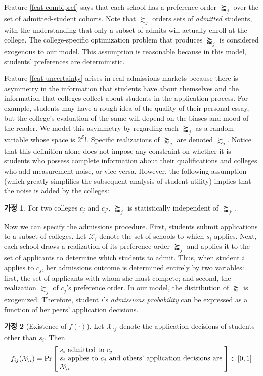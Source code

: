 \documentclass[12pt]{article} %
\theoremstyle{definition}
\newtheorem{assumption}{Assumption}
\theoremstyle{definition}
\newtheorem{assumption}{가정}
\begin{document}
Feature \ref{feat-combipref} says that each school has a preference order $\succapprox_j$ over the set of admitted-student cohorts. Note that $\succsim_j$ orders sets of \emph{admitted} students, with the understanding that only a subset of admits will actually enroll at the college. The college-specific optimization problem that produces $\succapprox_j$ is considered exogenous to our model. This assumption is reasonable because in this model, students' preferences are deterministic. 

Feature \ref{feat-uncertainty} arises in real admissions markets because there is asymmetry in the information that students have about themselves and the information that colleges collect about students in the application process. For example, students may have a rough idea of the quality of their personal essay, but the college's evaluation of the same will depend on the biases and mood of the reader. We model this asymmetry by regarding each $\succapprox_j$ as a random variable whose space is $2^{\mathcal{S}}!$. Specific realizations of $\succapprox_j$ are denoted $\succsim_j$. Notice that this definition alone does not impose any constraint on whether it is students who possess complete information about their qualifications and colleges who add measurement noise, or vice-versa. However, the following assumption (which greatly simplifies the subsequent analysis of student utility) implies that the noise is added by the colleges:
\begin{assumption} \label{preforderdrawnindep}
For two colleges $c_j$ and $c_{j'}$, $\succapprox_j$ is statistically independent of $\succapprox_{j'}$. 
\end{assumption}

Now we can specify the admissions procedure. First, students submit applications to a subset of colleges. Let $\mathcal{X}_i$ denote the set of schools to which $s_i$ applies. Next, each school draws a realization of its preference order $\succapprox_j$ and applies it to the set of applicants to determine which students to admit. Thus, when student $i$ applies to $c_j$, her admissions outcome is determined entirely by two variables: first, the set of applicants with whom she must compete; and second, the realization $\succsim_j$ of $c_j$’s preference order. In our model, the distribution of $\succapprox$ is exogenized. Therefore, student $i$’s \emph{admissions probability} can be expressed as a function of her peers’ application decisions.
\begin{assumption}[Existence of $f(\cdot)$]
Let $\mathcal{X}_{\setminus i}$ denote the application decisions of students other than $s_i$. Then
\begin{equation}
f_{ij}(\mathcal{X}_{\setminus i}) = \operatorname{Pr}\left[\;\parbox{23em}{$s_i$ admitted to $c_j$~\textbar~\\$s_i$ applies to $c_j$ and others’ application decisions are $\mathcal{X}_{\setminus i}$}\;\right] \in [0, 1]
\end{equation}
\end{assumption}
\end{document}
